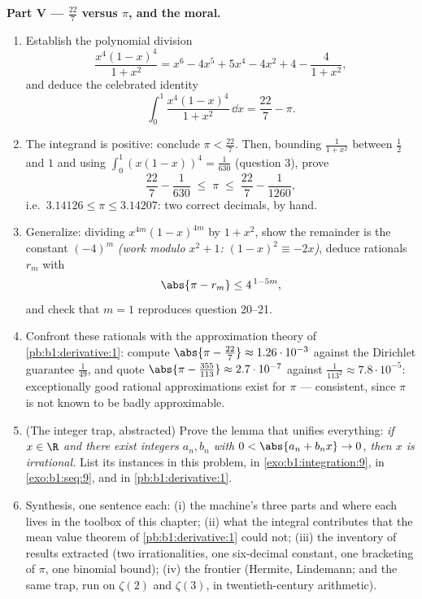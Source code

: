 \begin{problem}
\medskip
\noindent\textbf{Part V --- $\frac{22}{7}$ versus $\pi$, and the
moral.}
\begin{enumerate}[resume]
  \item Establish the polynomial division
        \[
        \frac{x^4(1-x)^4}{1 + x^2}
        = x^6 - 4x^5 + 5x^4 - 4x^2 + 4 - \frac{4}{1 + x^2},
        \]
        and deduce the celebrated identity
        \[
        \int_0^1 \frac{x^4 (1-x)^4}{1 + x^2}\,\dd x
        = \frac{22}{7} - \pi .
        \]
  \item The integrand is positive: conclude $\pi <
        \frac{22}{7}$. Then, bounding $\frac{1}{1+x^2}$ between
        $\frac12$ and $1$ and using $\int_0^1 (x(1-x))^4 =
        \frac{1}{630}$ (question 3), prove
        \[
        \frac{22}{7} - \frac{1}{630} \;\leq\; \pi \;\leq\;
        \frac{22}{7} - \frac{1}{1260} ,
        \]
        i.e.\ $3.14126 \leq \pi \leq 3.14207$: two correct
        decimals, by hand.
  \item Generalize: dividing $x^{4m}(1-x)^{4m}$ by $1 + x^2$,
        show the remainder is the constant $(-4)^m$ \emph{(work
        modulo $x^2 + 1$: $(1-x)^2 \equiv -2x$)}, deduce
        rationals $r_m$ with
        \[
        \abs{\pi - r_m} \leq 4^{\,1 - 5m} ,
        \]
        and check that $m = 1$ reproduces question 20--21.
  \item Confront these rationals with the approximation theory
        of \cref{pb:b1:derivative:1}: compute $\abs{\pi -
        \frac{22}{7}} \approx 1.26\cdot10^{-3}$ against the
        Dirichlet guarantee $\frac{1}{49}$, and quote
        $\abs{\pi - \frac{355}{113}} \approx 2.7\cdot10^{-7}$
        against $\frac{1}{113^2} \approx 7.8\cdot10^{-5}$:
        exceptionally good rational approximations exist for
        $\pi$ --- consistent, since $\pi$ is not known to be
        badly approximable.
  \item (The integer trap, abstracted) Prove the lemma that
        unifies everything: \emph{if $x \in \R$ and there exist
        integers $a_n, b_n$ with $0 < \abs{a_n + b_n x} \to 0$,
        then $x$ is irrational.} List its instances in this
        problem, in \cref{exo:b1:integration:9}, in
        \cref{exo:b1:seq:9}, and in \cref{pb:b1:derivative:1}.
  \item Synthesis, one sentence each: (i) the machine's three
        parts and where each lives in the toolbox of this
        chapter; (ii) what the integral contributes that the
        mean value theorem of \cref{pb:b1:derivative:1} could
        not; (iii) the inventory of results extracted (two
        irrationalities, one six-decimal constant, one
        bracketing of $\pi$, one binomial bound); (iv) the
        frontier (Hermite, Lindemann; and the same trap, run on
        $\zeta(2)$ and $\zeta(3)$, in twentieth-century
        arithmetic).
\end{enumerate}
\end{problem}
